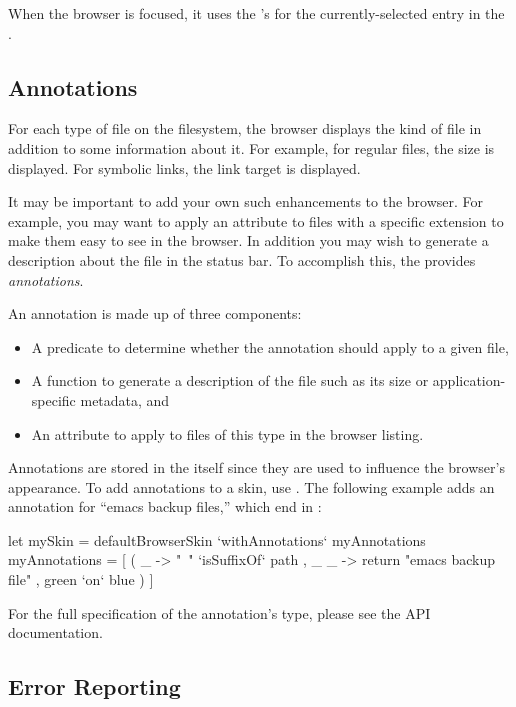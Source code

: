 When the browser is focused, it uses the 's
 for the currently-selected entry in the .

\subsection{Annotations}

For each type of file on the filesystem, the browser displays the kind
of file in addition to some information about it.  For example, for
regular files, the size is displayed.  For symbolic links, the link
target is displayed.

It may be important to add your own such enhancements to the browser.
For example, you may want to apply an attribute to files with a
specific extension to make them easy to see in the browser.  In
addition you may wish to generate a description about the file in the
status bar.  To accomplish this, the  provides
\textit{annotations}.

An annotation is made up of three components:

\begin{itemize}
\item A predicate to determine whether the annotation should apply to
  a given file,
\item A function to generate a description of the file such as its
  size or application-specific metadata, and
\item An attribute to apply to files of this type in the browser
  listing.
\end{itemize}

Annotations are stored in the  itself since they are
used to influence the browser's appearance.  To add annotations to a
skin, use .  The following example adds an
annotation for ``emacs backup files,'' which end in :

\begin{haskellcode}
 let mySkin = defaultBrowserSkin `withAnnotations` myAnnotations
     myAnnotations = [ ( \path _ -> "~" `isSuffixOf` path
                       , \_ _ -> return "emacs backup file"
                       , green `on` blue
                       )
                     ]
\end{haskellcode}

For the full specification of the annotation's type, please see the
API documentation.

\subsection{Error Reporting}

